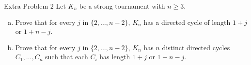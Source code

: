 \documentclass[8pt]{extarticle}
\begin{document}
  \begin{problem}{Extra Problem 2}
    Let $K_n$ be a strong tournament with $n \geq 3$. 
    \begin{enumerate}[(a)]
      \item Prove that for every $j$ in $\{2,\dots,n-2\}$, $K_n$ has a directed cycle of length $1 + j$ or $1 + n - j$. 
      \item Prove that for every $j$ in $\{2,\dots,n-2\}$, $K_n$ has $n$ distinct directed cycles $C_1,\dots,C_n$ such that each $C_i$ has length $1 + j$ or $1 + n - j$.
    \end{enumerate}
  \end{problem}
\end{document}
